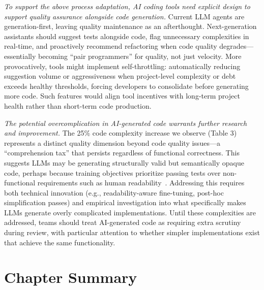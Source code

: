 \emph{To support the above process adaptation, AI coding tools need explicit design to support quality assurance alongside code generation.}
Current LLM agents are generation-first, leaving quality maintenance as an afterthought.
Next-generation assistants should suggest tests alongside code, flag unnecessary complexities in real-time, and proactively recommend refactoring when code quality degrades---essentially becoming ``pair programmers'' for quality, not just velocity. 
More provocatively, tools might implement self-throttling: automatically reducing suggestion volume or aggressiveness when project-level complexity or debt exceeds healthy thresholds, forcing developers to consolidate before generating more code. 
Such features would align tool incentives with long-term project health rather than short-term code production.

\emph{The potential overcomplication in AI-generated code warrants further research and improvement.}
The 25\% code complexity increase we observe (Table 3) represents a distinct quality dimension beyond code quality issues---a ``comprehension tax'' that persists regardless of functional correctness. 
This suggests LLMs may be generating structurally valid but semantically opaque code, perhaps because training objectives prioritize passing tests over non-functional requirements such as human readability~\cite{zheng2024beyond, gureja2025verification}. 
Addressing this requires both technical innovation (e.g., readability-aware fine-tuning, post-hoc simplification passes) and empirical investigation into what specifically makes LLMs generate overly complicated implementations. 
Until these complexities are addressed, teams should treat AI-generated code as requiring extra scrutiny during review, with particular attention to whether simpler implementations exist that achieve the same functionality.

\section{Chapter Summary}
\label{sec:cursor-data-avail}

